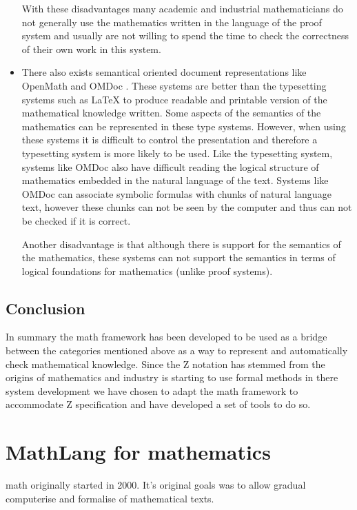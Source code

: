 \begin{itemize}
With these disadvantages many academic and industrial mathematicians do not
generally use the mathematics written in the language of the proof system and
usually are not willing to spend the time to check the correctness of their own
work in this system.

\item There also exists semantical oriented document representations like
OpenMath \cite{openmath} and OMDoc \cite{omdoc}. These systems are better than
the typesetting systems such as \LaTeX{} to produce readable and printable
version of the mathematical knowledge written. Some aspects of the semantics of
the mathematics can be represented in these type systems. However, when using
these systems it is difficult to control the presentation and therefore a
typesetting system is more likely to be used. Like the typesetting system,
systems like OMDoc also have difficult reading the logical structure of
mathematics embedded in the natural language of the text. Systems like OMDoc can
associate symbolic formulas with chunks of natural language text, however these
chunks can not be seen by the computer and thus can not be checked if it is
correct.

Another disadvantage is that although there is support for the semantics of the
mathematics, these systems can not support the semantics in terms of logical
foundations for mathematics (unlike proof systems).
\end{itemize}


\subsection{Conclusion}

In summary the \gls{math} framework has been developed to be used as a bridge
between the categories mentioned above as a way to represent and automatically
check mathematical knowledge. Since the Z notation has stemmed from the origins
of mathematics and industry is starting to use formal methods in there system
development we have chosen to adapt the \gls{math} framework to accommodate Z
specification and have developed a set of tools to do so.

\section{MathLang for mathematics}
\label{sec:mathlangbackground}

\Gls{math} originally started in 2000. It's original goals was to allow gradual
\gls{computerise} and \gls{formalise} of mathematical texts.

